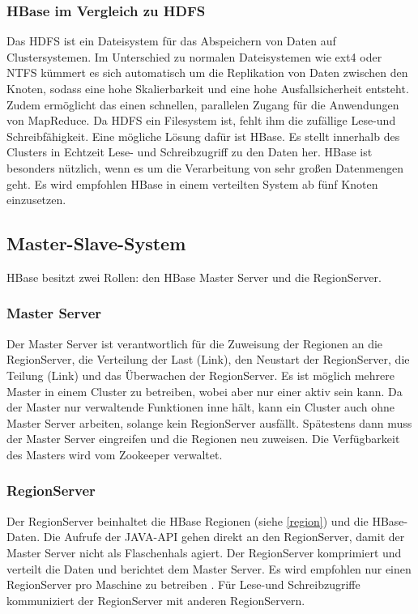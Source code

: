 \subsubsection{HBase im Vergleich zu HDFS}
Das \ac{HDFS} ist ein Dateisystem für das Abspeichern von Daten auf Clustersystemen. Im Unterschied zu normalen Dateisystemen wie ext4 oder NTFS kümmert es sich automatisch um die Replikation von Daten zwischen den Knoten,  
sodass eine hohe Skalierbarkeit und eine hohe Ausfallsicherheit entsteht. Zudem ermöglicht das einen schnellen, parallelen Zugang für die Anwendungen von MapReduce. Da HDFS ein Filesystem ist, fehlt ihm die zufällige Lese-und Schreibfähigkeit. Eine mögliche Lösung dafür ist HBase. Es stellt innerhalb des Clusters in Echtzeit Lese- und Schreibzugriff zu den Daten her. HBase ist besonders nützlich, wenn es um die Verarbeitung von sehr großen Datenmengen geht. Es wird empfohlen HBase in einem verteilten System ab fünf Knoten einzusetzen.


\subsection{Master-Slave-System}
HBase besitzt zwei Rollen: den HBase Master Server und die RegionServer.

\subsubsection{Master Server}
Der Master Server ist verantwortlich für die Zuweisung der Regionen an die RegionServer, die Verteilung der Last (Link), den Neustart der RegionServer, die Teilung (Link) und das Überwachen der RegionServer. Es ist möglich mehrere Master in einem Cluster zu betreiben, wobei aber nur einer aktiv sein kann. Da der Master nur verwaltende Funktionen inne hält, kann ein Cluster auch ohne Master Server arbeiten, solange kein RegionServer ausfällt. Spätestens dann muss der Master Server eingreifen und die Regionen neu zuweisen. Die Verfügbarkeit des Masters wird vom Zookeeper verwaltet.

\subsubsection{RegionServer}
Der RegionServer beinhaltet die HBase Regionen (siehe \ref{region}) und die HBase-Daten. Die Aufrufe der JAVA-API gehen direkt an den RegionServer, damit der Master Server nicht als Flaschenhals agiert. Der RegionServer komprimiert und verteilt die Daten und berichtet dem Master Server. Es wird empfohlen nur einen RegionServer pro Maschine zu betreiben \cite{Redt01}. Für Lese-und Schreibzugriffe kommuniziert der RegionServer mit anderen RegionServern.

